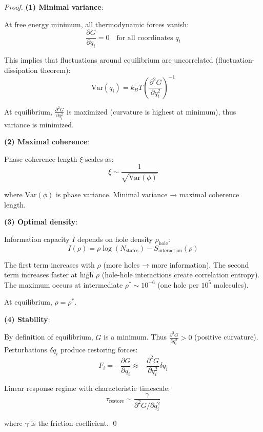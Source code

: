 \documentclass[12pt,a4paper]{article}
\begin{document}
\begin{proof}
\textbf{(1) Minimal variance}:

At free energy minimum, all thermodynamic forces vanish:
\begin{equation}
\frac{\partial G}{\partial q_i} = 0 \quad \text{for all coordinates } q_i
\end{equation}

This implies that fluctuations around equilibrium are uncorrelated (fluctuation-dissipation theorem):
\begin{equation}
\text{Var}(q_i) = k_B T \left(\frac{\partial^2 G}{\partial q_i^2}\right)^{-1}
\end{equation}

At equilibrium, $\frac{\partial^2 G}{\partial q_i^2}$ is maximized (curvature is highest at minimum), thus variance is minimized.

\textbf{(2) Maximal coherence}:

Phase coherence length $\xi$ scales as:
\begin{equation}
\xi \sim \frac{1}{\sqrt{\text{Var}(\phi)}}
\end{equation}

where $\text{Var}(\phi)$ is phase variance. Minimal variance → maximal coherence length.

\textbf{(3) Optimal density}:

Information capacity $I$ depends on hole density $\rho_{\text{hole}}$:
\begin{equation}
I(\rho) = \rho \log(N_{\text{states}}) - S_{\text{interaction}}(\rho)
\end{equation}

The first term increases with $\rho$ (more holes → more information). The second term increases faster at high $\rho$ (hole-hole interactions create correlation entropy). The maximum occurs at intermediate $\rho^* \sim 10^{-6}$ (one hole per $10^5$  molecules).

At equilibrium, $\rho = \rho^*$.

\textbf{(4) Stability}:

By definition of equilibrium, $G$ is a minimum. Thus $\frac{\partial^2 G}{\partial q_i^2} > 0$ (positive curvature). Perturbations $\delta q_i$ produce restoring forces:
\begin{equation}
F_i = -\frac{\partial G}{\partial q_i} \approx -\frac{\partial^2 G}{\partial q_i^2} \delta q_i
\end{equation}

Linear response regime with characteristic timescale:
\begin{equation}
\tau_{\text{restore}} \sim \frac{\gamma}{\partial^2 G / \partial q_i^2}
\end{equation}

where $\gamma$ is the friction coefficient. \qed
\end{proof}
\end{document}
